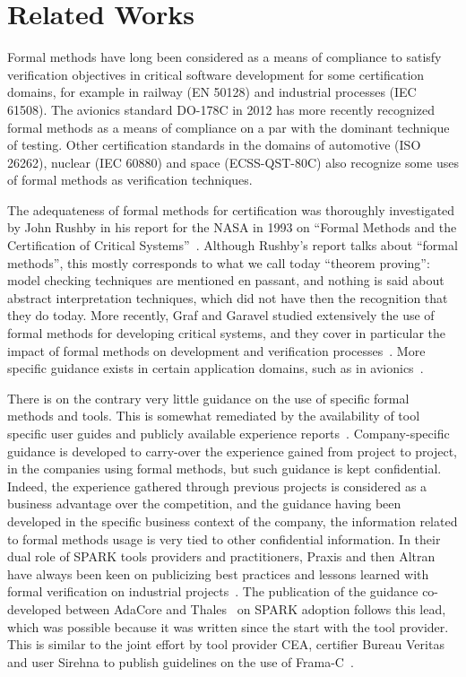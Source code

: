 \documentclass{llncs}
\begin{document}
\section{Related Works}
\label{sec:related-works}

Formal methods have long been considered as a means of compliance to satisfy
verification objectives in critical software development for some certification
domains, for example in railway (EN 50128) and industrial processes (IEC
61508). The avionics standard DO-178C in 2012 has more recently recognized
formal methods as a means of compliance on a par with the dominant technique of
testing. Other certification standards in the domains of automotive (ISO
26262), nuclear (IEC 60880) and space (ECSS-QST-80C) also recognize some uses
of formal methods as verification techniques.

The adequateness of formal methods for certification was thoroughly
investigated by John Rushby in his report for the NASA in 1993 on ``Formal
Methods and the Certification of Critical
Systems''~\cite{Rushby93formalmethods}. Although Rushby's report talks about
``formal methods'', this mostly corresponds to what we call today ``theorem
proving'': model checking techniques are mentioned en passant, and nothing is
said about abstract interpretation techniques, which did not have then the
recognition that they do today. More recently, Graf and Garavel studied
extensively the use of formal methods for developing critical systems, and they
cover in particular the impact of formal methods on development and
verification processes~\cite{GrafGaravel-BSI-2013}. More specific guidance
exists in certain application domains, such as in
avionics~\cite{BrownERTS2010}.

There is on the contrary very little guidance on the use of specific formal
methods and tools. This is somewhat remediated by the availability of tool
specific user guides and publicly available experience
reports~\cite{Woodcock2009}. Company-specific guidance is developed to
carry-over the experience gained from project to project, in the companies
using formal methods, but such guidance is kept confidential. Indeed, the
experience gathered through previous projects is considered as a business
advantage over the competition, and the guidance having been developed in the
specific business context of the company, the information related to formal
methods usage is very tied to other confidential information. In their dual
role of SPARK tools providers and practitioners, Praxis and then Altran have
always been keen on publicizing best practices and lessons learned with formal
verification on industrial
projects~\cite{KingHCP00,Chapman2006CCM,Chapman2014ITP}. The publication of the
guidance co-developed between AdaCore and Thales~\cite{AdaCoreThalesSPARK} on
SPARK adoption follows this lead, which was possible because it was written
since the start with the tool provider. This is similar to the joint effort by
tool provider CEA, certifier Bureau Veritas and user Sirehna to publish
guidelines on the use of Frama-C~\cite{FramaCguidelines}.
\end{document}
